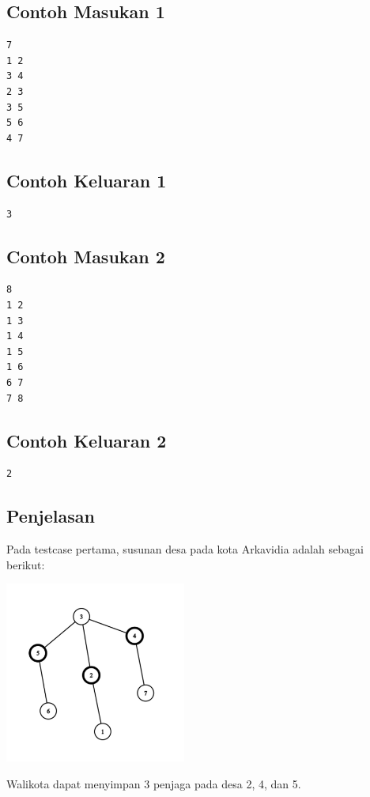 \documentclass{article}
\begin{document}
\begin{multicols}{2}
\subsection*{Contoh Masukan 1}
\begin{lstlisting}
7
1 2
3 4
2 3
3 5
5 6
4 7
\end{lstlisting}
\columnbreak

\subsection*{Contoh Keluaran 1}
\begin{lstlisting}
3
\end{lstlisting}
\vfill
\null
\end{multicols}

\begin{multicols}{2}
\subsection*{Contoh Masukan 2}
\begin{lstlisting}
8
1 2
1 3
1 4
1 5
1 6
6 7
7 8
\end{lstlisting}
\columnbreak

\subsection*{Contoh Keluaran 2}
\begin{lstlisting}
2
\end{lstlisting}
\vfill
\null
\end{multicols}

\pagebreak
\subsection*{Penjelasan}
Pada testcase pertama, susunan desa pada kota Arkavidia adalah sebagai berikut:

\includegraphics[width=225px]{graph.png}

Walikota dapat menyimpan 3 penjaga pada desa 2, 4, dan 5.
\end{document}
